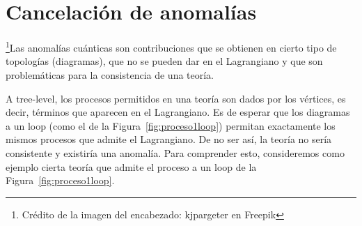 \chapter{Cancelación de anomalías}
\label{ch:anomalias}

\footnote{Crédito de la imagen del encabezado: kjpargeter en Freepik}Las anomalías cuánticas son contribuciones que se obtienen en cierto tipo de topologías (diagramas), que no se pueden dar en el Lagrangiano y que son problemáticas para la consistencia de una teoría.

A tree-level, los procesos permitidos en una teoría son dados por los vértices, es decir, términos que aparecen en el Lagrangiano. Es de esperar que los diagramas a un loop (como el de la Figura~\ref{fig:proceso1loop}) permitan exactamente los mismos procesos que admite el Lagrangiano. De no ser así, la teoría no sería consistente y existiría una anomalía. Para comprender esto, consideremos como ejemplo cierta teoría que admite el proceso a un loop de la Figura~\ref{fig:proceso1loop}.




